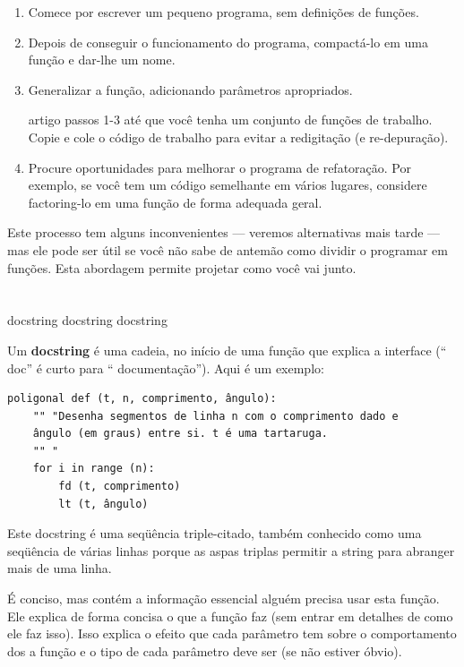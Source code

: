 \documentclass[10pt]{book}
\begin{document}
\begin{enumerate}

\item Comece por escrever um pequeno programa, sem definições de funções.

\item Depois de conseguir o funcionamento do programa, compactá-lo em uma função
e dar-lhe um nome.

\item Generalizar a função, adicionando parâmetros apropriados.

\Repita artigo passos 1-3 até que você tenha um conjunto de funções de trabalho.
Copie e cole o código de trabalho para evitar a redigitação (e re-depuração).

\item Procure oportunidades para melhorar o programa de refatoração.
Por exemplo, se você tem um código semelhante em vários lugares, considere
factoring-lo em uma função de forma adequada geral.

\end{enumerate}

Este processo tem alguns inconvenientes --- veremos alternativas mais tarde --- mas
ele pode ser útil se você não sabe de antemão como dividir o
programar em funções. Esta abordagem permite projetar como você vai
junto.


\section{} docstring
\label{} docstring
\index{} docstring

Um {\bf docstring} é uma cadeia, no início de uma função que
explica a interface (`` doc'' é curto para `` documentação''). Aqui
é um exemplo:

\begin{verbatim}
poligonal def (t, n, comprimento, ângulo):
    "" "Desenha segmentos de linha n com o comprimento dado e
    ângulo (em graus) entre si. t é uma tartaruga.
    "" "    
    for i in range (n):
        fd (t, comprimento)
        lt (t, ângulo)
\end{verbatim}
%
Este docstring é uma seqüência triple-citado, também conhecido
como uma seqüência de várias linhas porque as aspas triplas permitir a string
para abranger mais de uma linha.

É conciso, mas contém a informação essencial
alguém precisa usar esta função. Ele explica de forma concisa o que
a função faz (sem entrar em detalhes de como ele faz
isso). Isso explica o efeito que cada parâmetro tem sobre o comportamento dos
a função e o tipo de cada parâmetro deve ser (se não estiver
óbvio).
\end{document}
